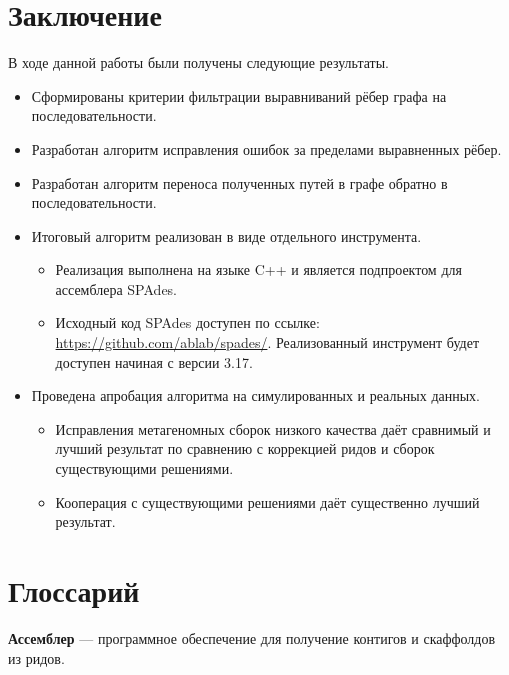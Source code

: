 \documentclass[14pt]{matmex-diploma-custom}
\begin{document}
\newpage
\section*{Заключение}
В ходе данной работы были получены следующие результаты.
\begin{itemize}
    \item Сформированы критерии фильтрации выравниваний рёбер графа на последовательности.
    \item Разработан алгоритм исправления ошибок за пределами выравненных рёбер.
    \item Разработан алгоритм переноса полученных путей в графе обратно в последовательности.
    \item Итоговый алгоритм реализован в виде отдельного инструмента.
    \begin{itemize}
        \item Реализация выполнена на языке C++ и является подпроектом для ассемблера SPAdes.
        \item \begin{sloppypar} Исходный код SPAdes доступен по ссылке: \mbox{\url{https://github.com/ablab/spades/}}. Реализованный инструмент будет доступен начиная с версии 3.17. \end{sloppypar}
    \end{itemize}
    \item Проведена апробация алгоритма на симулированных и реальных данных.
    \begin{itemize}
        \item Исправления метагеномных сборок низкого качества даёт сравнимый и лучший результат по сравнению с коррекцией ридов и сборок существующими решениями.
        \item Кооперация с существующими решениями даёт существенно лучший результат.
    \end{itemize}

\end{itemize}


\section*{Глоссарий}

\textbf{Ассемблер} --- программное обеспечение для получение контигов и скаффолдов из ридов.\\
\end{document}
